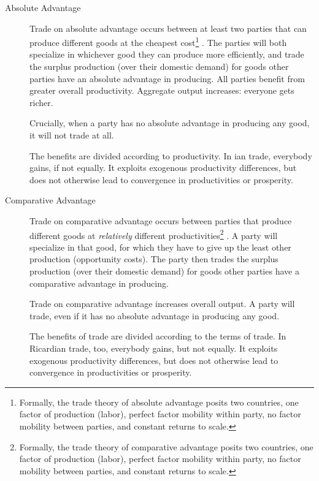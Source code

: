 \begin{description}
	\item[Absolute Advantage] \label{itm:absolute-advantage}Trade on absolute advantage occurs between at least two parties that can produce different goods at the cheapest cost\footnote{
		Formally, the trade theory of absolute advantage posits two countries, one factor of production (labor), perfect factor mobility within party, no factor mobility between parties, and constant returns to scale.} \citep{Smith-1776-lq}. The parties will both specialize in whichever good they can produce more efficiently, and trade the surplus production (over their domestic demand) for goods other parties have an absolute advantage in producing. All parties benefit from greater overall productivity. Aggregate output increases: everyone gets richer. 

	Crucially, when a party has no absolute advantage in producing any good, it will not trade at all. 

	The benefits are divided according to productivity. %
	In \citeauthor{Smith-1776-lq}ian trade, everybody gains, if not equally. It exploits exogenous productivity differences, but does not otherwise lead to convergence in productivities or prosperity.

	\item[Comparative Advantage]\label{itm:comparative-advantage} Trade on comparative advantage occurs between parties that produce different goods at \emph{relatively} different productivities\footnote{
		Formally, the trade theory of comparative advantage posits two countries, one factor of production (labor), perfect factor mobility within party, no factor mobility between parties, and constant returns to scale.} 
	\citep{Ricardo1817}. A party will specialize in that good, for which they have to give up the least other production (opportunity costs). The party then trades the surplus production (over their domestic demand) for goods other parties have a comparative advantage in producing. 
	
	Trade on comparative advantage increases overall output. 
	A party will trade, even if it has no absolute advantage in producing any good.

	The benefits of trade are divided according to the terms of trade. %
	In Ricardian trade, too, everybody gains, but not equally. It exploits exogenous productivity differences, but does not otherwise lead to convergence in productivities or prosperity.


\end{description}
